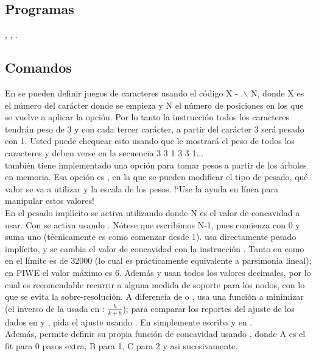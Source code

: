 \subsection{Programas}
\noindent
{}, , .\\
\subsection{Comandos}
En  se pueden definir juegos de caracteres usando el c\'odigo X - .$\backslash$ N, donde X es el n\'umero del car\'acter donde se empieza y N el n\'umero de posiciones en los que se vuelve a aplicar la opci\'on. Por lo tanto la instrucci\'on  todos los caracteres tendr\'an peso de 3 y con  cada tercer car\'acter, a partir del car\'acter 3 ser\'a pesado con 1. Usted puede chequear esto usando  que le mostrar\'a el peso de todos los caracteres y deben verse en la secuencia 3 3 1 3 3 1...\\
 tambi\'en tiene implementado una opci\'on para tomar pesos a partir de los \'arboles en memoria. Esa opci\'on es , en la que se pueden modificar el tipo de pesado, qu\'e valor se va a utilizar y la escala de los pesos. !`Use la ayuda en l\'inea para manipular estos valores!\\
En  el pesado impl\'icito se activa utilizando  donde N es el valor de concavidad a usar. Con  se activa usando . N\'otese que escribimos N-1, pues  comienza con 0 y suma uno (t\'ecnicamente es como comenzar desde 1).  usa directamente pesado impl\'icito, y se cambia el valor de concavidad con la instrucci\'on . Tanto en  como en  el l\'imite es de 32000 (lo cual es pr\'acticamente equivalente a parsimonia lineal); en PIWE el valor m\'aximo es 6. Adem\'as  y  usan todos los valores decimales, por lo cual es recomendable recurrir a alguna medida de soporte para los nodos, con lo que se evita la sobre-resoluci\'on. A diferencia de  o ,  usa una funci\'on a minimizar (el inverso de la usada en : $\frac{h}{k + h}$); para comparar los reportes del ajuste de los dados en  y , pida el ajuste usando .  En  simplemente escriba  y en  .\\
Adem\'as,  permite definir su propia funci\'on de concavidad usando \Cmd{piwe [A B C...;}, donde A es el fit para 0 pasos extra, B para 1, C para 2 y asi sucesivamente.
